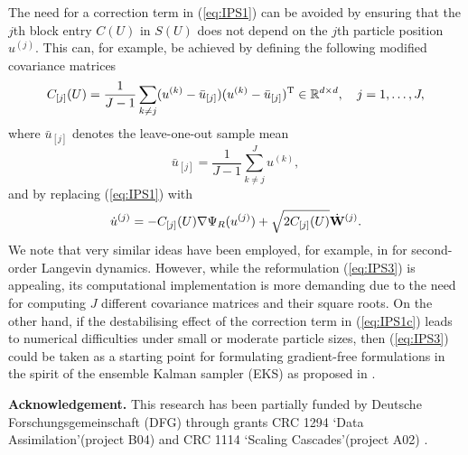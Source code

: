 \documentclass[11pt]{article}
\begin{document}
The need for a correction term in (\ref{eq:IPS1}) can be avoided by ensuring that the $j$th block entry $C(U)$ in $S(U)$ 
does not depend on the $j$th particle position $u^{(j)}$. This can, for example, be achieved by defining the following modified 
covariance matrices
\begin{equation}
C_{[j]}(U) = \frac{1}{J-1} \sum_{k\not=j} (u^{(k)}-\bar{u}_{[j]})(u^{(k)}-\bar u_{[j]})^{\rm T} \in \mathbb{R}^{d\times d}, \quad j=1,\ldots,J, 
\end{equation}
where $\bar u_{[j]}$ denotes the leave-one-out sample mean
\begin{equation}
\bar u_{[j]} = \frac{1}{J-1}\sum_{k\not=j}^J u^{(k)},
\end{equation}
and by replacing (\ref{eq:IPS1}) with
\begin{equation} \label{eq:IPS3}
\dot{u}^{(j)} = -C_{[j]}(U)\nabla \Psi_R(u^{(j)}) + \sqrt{2C_{[j]}(U)} \dot{\bf W}^{(j)}.
\end{equation}
We note that very similar ideas have been employed, for example, in \cite{sr:LMW18} for second-order Langevin dynamics. However, while
the reformulation (\ref{eq:IPS3}) is appealing, its computational implementation is more demanding due to the need for computing $J$ 
different covariance matrices and their square roots.  On the other hand, if the destabilising
effect of the correction term in (\ref{eq:IPS1c}) leads to numerical difficulties under small or moderate particle sizes, 
then (\ref{eq:IPS3}) could be taken as a starting point for formulating gradient-free formulations in the spirit of the ensemble Kalman 
sampler (EKS) as proposed in \cite{sr:GIHLS19}.

\medskip \medskip

\noindent
{\bf Acknowledgement.} This research has been partially funded by 
Deutsche Forschungsgemeinschaft (DFG) through grants 
CRC 1294 \lq Data Assimilation\rq (project B04) and CRC 1114 \lq Scaling Cascades\rq (project A02) .

%
%


%
%
\end{document}
